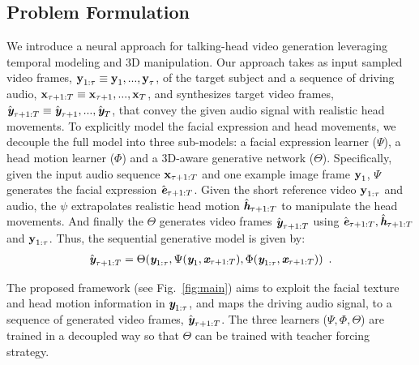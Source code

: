 \documentclass[runningheads]{llncs}
\def\mathbi#1{\textbf{\em #1}}
\begin{document}
\subsection{Problem Formulation}
\label{subsec:problem_formulation}
We introduce a neural approach for talking-head video generation leveraging temporal modeling and 3D manipulation. Our approach takes as input sampled video frames, $\mathbi{\mathbi{y}}_{1:\tau} \equiv \mathbi{\mathbi{y}}_1,...,\mathbi{\mathbi{y}}_{\tau}$, of the target subject and a sequence of driving audio, $\mathbi{\mathbi{x}}_{\tau+ 1:T}  \equiv \mathbi{\mathbi{x}}_{\tau + 1},...,\mathbi{\mathbi{x}}_T$, and synthesizes target video frames, $\hat{\mathbi{y}}_{\tau + 1:T}  \equiv \hat{\mathbi{y}}_{\tau + 1}, ...,\hat{\mathbi{y}}_T$, that convey the given audio signal with realistic head movements. To explicitly model the facial expression and head movements, we decouple the full model into three sub-models: a facial expression learner ($\Psi$), a head motion learner ($\Phi$) and a 3D-aware generative network ($\Theta$). Specifically, given the input audio sequence $\mathbi{\mathbi{x}}_{\tau+ 1:T}$ and one example image frame $\mathbi{\mathbi{y}}_{1}$, $\Psi$ generates the facial expression $\hat{\mathbi{e}}_{\tau+1: T}$. Given the short reference video $\mathbi{\mathbi{y}}_{1:\tau}$ and audio, the $\psi$ extrapolates realistic head motion $\hat{\mathbi{h}}_{\tau + 1:T}$ to manipulate the head movements. And finally the $\Theta$ generates video frames $\hat{\mathbi{y}}_{\tau + 1:T}$ using $\hat{\mathbi{e}}_{\tau+1: T}, \hat{\mathbi{h}}_{\tau+1: T}$ and $\mathbi{\mathbi{y}}_{1:\tau}$.  Thus, the sequential generative model is given by:
\begin{equation}
\begin{aligned}
\hat{\mathbi{y}}_{ \tau+1:T} =  \Theta( \mathbi{y}_{1:\tau},\Psi( \mathbi{y}_{1} , \mathbi{x}_{\tau +1:T} ), \Phi(\mathbi{y}_{1:\tau},\mathbi{x}_{\tau +1:T} )  )  \enspace.
\end{aligned}
\label{eq:training}    
\end{equation}

The proposed framework (see Fig.~\ref{fig:main}) aims to exploit the facial texture and head motion information in $\mathbi{y}_{1:\tau}$, and maps the driving audio signal, to a sequence of generated video frames, $\hat{\mathbi{y}}_{ \tau+1:T}$. The three learners ($\Psi, \Phi, \Theta$) are trained in a decoupled way so that $\Theta$ can be trained with teacher forcing strategy. 
\end{document}
